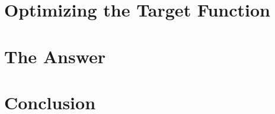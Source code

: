 \documentclass[11pt]{memoir}
\begin{document}
    \section{Optimizing the Target Function}\label{sec:optimizing-the-target-function}


    \section{The Answer}\label{sec:answer}


    \section{Conclusion}\label{sec:conclusion}



\end{document}
